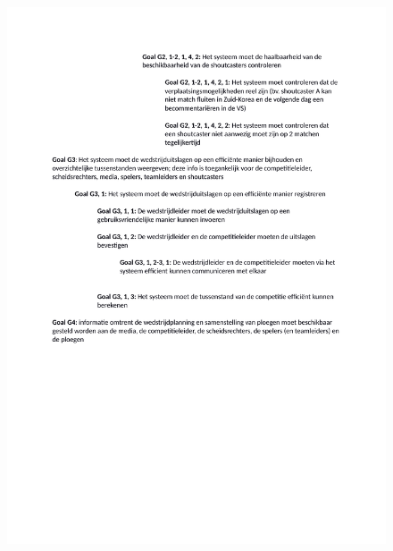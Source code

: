 \documentclass[12pt,a4paper]{article}
\begin{document}
			\begin{figure}[H]
				\includegraphics[width=\textwidth]{../2-Doelen/Goals4.pdf}
			\end{figure}
			
\end{document}
